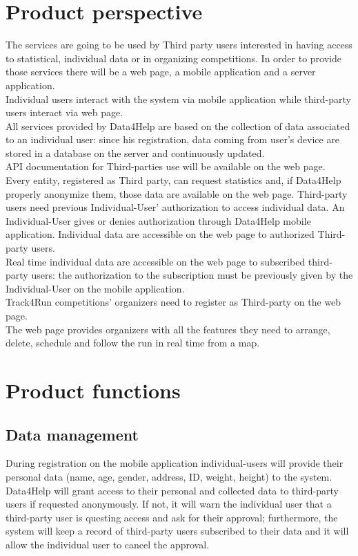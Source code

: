 \section{Product perspective}
The services are going to be used by Third party users interested in having access to statistical, individual data or in organizing competitions. In order to provide those services there will be a web page, a mobile application and a server application.  \\
Individual users interact with the system via mobile application while third-party users interact via web page. \\
All services provided by Data4Help are based on the collection of data associated to an individual user: since his registration, data coming from user’s device are stored in a database on the server and continuously updated. \\
API documentation for Third-parties use will be available on the web page. \\
Every entity, registered as Third party, can request statistics and, if Data4Help properly anonymize them, those data are available on the web page.   
Third-party users need previous Individual-User’ authorization to access individual data. An Individual-User gives or denies authorization through Data4Help mobile application. Individual data are accessible on the web page to authorized Third-party users.  \\
Real time individual data are accessible on the web page to subscribed third-party users: the authorization to the subscription must be previously given by the Individual-User on the mobile application.  \\
Track4Run competitions’ organizers need to register as Third-party on the web page. \\
The web page provides organizers with all the features they need to arrange, delete, schedule and follow the run in real time from a map. 

\section{Product functions}
\subsection{Data management}
During registration on the mobile application individual-users will provide their personal data (name, age, gender, address, ID, weight, height) to the system. Data4Help will grant access to their personal and collected data to third-party users if requested anonymously. If not, it will warn the individual user that a third-party user is questing access and ask for their approval; furthermore, the system will keep a record of third-party users subscribed to their data and it will allow the individual user to cancel the approval.
